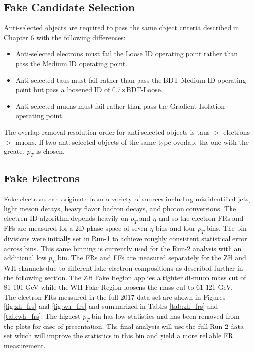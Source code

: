 \subsection{Fake Candidate Selection}
Anti-selected objects are required to pass the same object criteria described in Chapter 6 with the following differences:
\begin{itemize}
    \item Anti-selected electrons must fail the Loose ID operating point rather than pass the Medium ID operating point.
    \item Anti-selected taus must fail rather than pass the BDT-Medium ID operating point but pass a loosened ID of 0.7$\times$BDT-Loose.
    \item Anti-selected muons must fail rather than pass the Gradient Isolation operating point.
\end{itemize}
\noindent The overlap removal resolution order for anti-selected objects is taus $>$ electrons $>$ muons. If two anti-selected objects of the same type overlap, the one with the greater $p_T$ is chosen.

\subsection{Fake Electrons}
Fake electrons can originate from a variety of sources including mis-identified jets, light meson decays, heavy flavor hadron decays, and photon conversions. The electron ID algorithm depends heavily on $p_T$ and $\eta$ and so the electron FRs and FFs are measured for a 2D phase-space of seven $\eta$ bins and four $p_T$ bins. The bin divisions were initially set in Run-1 to achieve roughly consistent statistical error across bins. This same binning is currently used for the Run-2 analysis with an additional low $p_T$ bin. The FRs and FFs are measured separately for the ZH and WH channels due to different fake electron compositions as described further in the following section. The ZH Fake Region applies a tighter di-muon mass cut of 81-101 GeV while the WH Fake Region loosens the mass cut to 61-121 GeV.\\

The electron FRs measured in the full 2017 data-set are shown in Figures \ref{fig:zh_frs} and \ref{fig:wh_frs} and summarized in Tables \ref{tab:zh_frs} and \ref{tab:wh_frs}. The highest $p_T$ bin has low statistics and has been removed from the plots for ease of presentation. The final analysis will use the full Run-2 data-set which will improve the statistics in this bin and yield a more reliable FR measurement.\\

